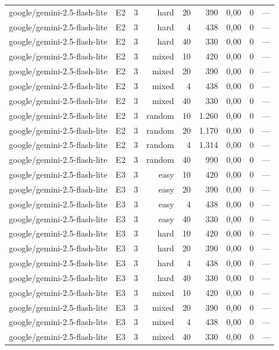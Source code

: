 \begin{table}[htbp]
\begin{tabular}{lllrrrrrr}
google/gemini-2.5-flash-lite & E2 & 3 & hard & 20 & 390 & 0,00 & 0 & — \\
google/gemini-2.5-flash-lite & E2 & 3 & hard & 4 & 438 & 0,00 & 0 & — \\
google/gemini-2.5-flash-lite & E2 & 3 & hard & 40 & 330 & 0,00 & 0 & — \\
google/gemini-2.5-flash-lite & E2 & 3 & mixed & 10 & 420 & 0,00 & 0 & — \\
google/gemini-2.5-flash-lite & E2 & 3 & mixed & 20 & 390 & 0,00 & 0 & — \\
google/gemini-2.5-flash-lite & E2 & 3 & mixed & 4 & 438 & 0,00 & 0 & — \\
google/gemini-2.5-flash-lite & E2 & 3 & mixed & 40 & 330 & 0,00 & 0 & — \\
google/gemini-2.5-flash-lite & E2 & 3 & random & 10 & 1.260 & 0,00 & 0 & — \\
google/gemini-2.5-flash-lite & E2 & 3 & random & 20 & 1.170 & 0,00 & 0 & — \\
google/gemini-2.5-flash-lite & E2 & 3 & random & 4 & 1.314 & 0,00 & 0 & — \\
google/gemini-2.5-flash-lite & E2 & 3 & random & 40 & 990 & 0,00 & 0 & — \\
google/gemini-2.5-flash-lite & E3 & 3 & easy & 10 & 420 & 0,00 & 0 & — \\
google/gemini-2.5-flash-lite & E3 & 3 & easy & 20 & 390 & 0,00 & 0 & — \\
google/gemini-2.5-flash-lite & E3 & 3 & easy & 4 & 438 & 0,00 & 0 & — \\
google/gemini-2.5-flash-lite & E3 & 3 & easy & 40 & 330 & 0,00 & 0 & — \\
google/gemini-2.5-flash-lite & E3 & 3 & hard & 10 & 420 & 0,00 & 0 & — \\
google/gemini-2.5-flash-lite & E3 & 3 & hard & 20 & 390 & 0,00 & 0 & — \\
google/gemini-2.5-flash-lite & E3 & 3 & hard & 4 & 438 & 0,00 & 0 & — \\
google/gemini-2.5-flash-lite & E3 & 3 & hard & 40 & 330 & 0,00 & 0 & — \\
google/gemini-2.5-flash-lite & E3 & 3 & mixed & 10 & 420 & 0,00 & 0 & — \\
google/gemini-2.5-flash-lite & E3 & 3 & mixed & 20 & 390 & 0,00 & 0 & — \\
google/gemini-2.5-flash-lite & E3 & 3 & mixed & 4 & 438 & 0,00 & 0 & — \\
google/gemini-2.5-flash-lite & E3 & 3 & mixed & 40 & 330 & 0,00 & 0 & — \\

\end{tabular}
\end{table}
